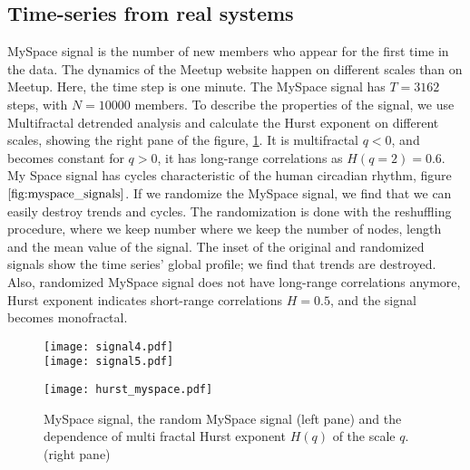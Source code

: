 \subsection{Time-series from real systems}

MySpace signal is the number of new members who appear for the first time in the data. The dynamics of the Meetup website happen on different scales than on Meetup. Here, the time step is one minute. The MySpace signal has $T = 3162$ steps, with  $N = 10000$ members.  To describe the properties of the signal, we use Multifractal detrended analysis and calculate the Hurst exponent on different scales, showing the right pane of the figure, \ref{fig:myspace_signals}. It is multifractal $q<0$, and becomes constant for $q>0$, it has long-range correlations as $H(q=2)=0.6$. My Space signal has cycles characteristic of the human circadian rhythm, figure $\ref{fig:myspace_signals}$. If we randomize the MySpace signal, we find that we can easily destroy trends and cycles. The randomization is done with the reshuffling procedure, where we keep number where we keep the number of nodes, length and the mean value of the signal. The inset of the original and randomized signals show the time series' global profile; we find that trends are destroyed. Also, randomized MySpace signal does not have long-range correlations anymore, Hurst exponent indicates short-range correlations $H=0.5$, and the signal becomes monofractal.    


\begin{figure}[H]
	\centering
	\begin{minipage}[b]{0.4\textwidth}
		\centering
		\texttt{[image: signal4.pdf]}\\
		\texttt{[image: signal5.pdf]}
	\end{minipage}
	\begin{minipage}[b]{0.45\textwidth}
		\centering
		\texttt{[image: hurst\_myspace.pdf]}
		\vspace{0.01cm}
	\end{minipage}
	\caption{MySpace signal, the random MySpace signal (left pane) and the dependence of multi fractal Hurst exponent $H(q)$ of the scale $q$. (right pane)}
	\label{fig:myspace_signals}
\end{figure}

